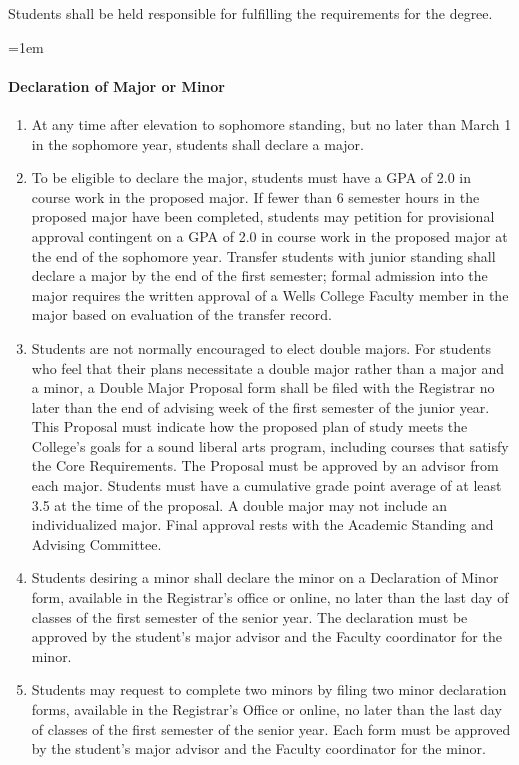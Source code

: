 \documentclass{manual}
\newcommand{\modified}[1]{}
\let\oldparagraph\paragraph
\renewcommand\paragraph{\leftskip=1em\oldparagraph}
\newcommand{\itemLevelA}{\alph*.}
\newcommand{\itemRefA}{\alph*}
\begin{document}
Students shall be held responsible for fulfilling the requirements for the degree.

\paragraph{Declaration of Major or Minor}

\begin{enumerate}[label=\itemLevelA,ref=\itemRefA]

\item At any time after elevation to sophomore standing, but no later than\modified{11/12/01} March 1 in the sophomore year, students shall declare a major.

\item To be eligible to declare the major, students must have a GPA of 2.0\modified{5/13/93} in course work in the proposed major. If fewer than 6 semester hours in the proposed major have been completed, students may petition for provisional approval contingent on a GPA of 2.0 in course work in the proposed major at the end of the sophomore year. Transfer students with junior standing shall declare a major by the end of the first semester; formal admission into the major requires the written approval of a Wells College Faculty member in the major based on evaluation of the transfer record.

\item Students are not normally encouraged to elect double majors. For students who feel \modified{10/17/00} that their plans necessitate a double major rather than a major and a minor,  a Double Major Proposal form shall be filed with the Registrar no later than the \modified{9/9/2003}
end of advising week of the first semester of the junior year. This Proposal must indicate how the proposed plan of study meets the College's goals for a sound liberal arts program, including courses that satisfy the Core Requirements. The Proposal must be approved by an advisor from each major. Students must have a cumulative grade point average of at least 3.5 at the time of the proposal. A double major may not include an individualized major. Final approval rests with the Academic Standing and Advising Committee.

\item Students desiring a minor shall declare the minor on a Declaration of Minor\modified{4/8/03} form, available in the Registrar's office or online, no later than\modified{5/08/12} the last day of classes of the first semester of the senior year. The declaration must be approved by the student's major advisor and the Faculty coordinator for the minor.

\item Students may request to complete two minors by filing two minor declaration forms, available in the Registrar's Office or online, no later than the last day of classes of the first semester of the senior year. Each form must be approved by the student's major advisor and the Faculty coordinator for the minor.
\end{enumerate}
\end{document}
